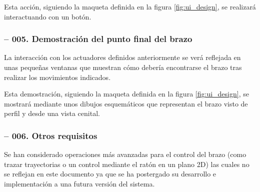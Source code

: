 Esta acción, siguiendo la maqueta definida en la figura \ref{fig:ui_design}, se realizará interactuando con
un botón.

\subsubsection*{ -- 005. Demostración del punto final del brazo}
La interacción con los actuadores definidos anteriormente se verá reflejada en unas pequeñas ventanas
que muestran cómo debería encontrarse el brazo tras realizar los movimientos indicados.

Esta demostración, siguiendo la maqueta definida en la figura \ref{fig:ui_design}, se mostrará mediante
unos dibujos esquemáticos que representan el brazo visto de perfil y desde una vista cenital.

\subsubsection*{ -- 006. Otros requisitos}
Se han considerado operaciones más avanzadas para el control del brazo (como trazar trayectorias o
un control mediante el ratón en un plano 2D) las cuales no se reflejan en este documento ya que se
ha postergado su desarrollo e implementación a una futura versión del sistema.
